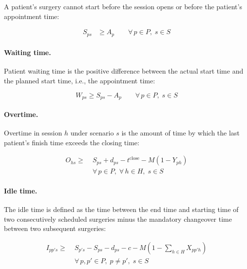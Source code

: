 A patient's surgery cannot start before the session opens or before the
patient's appointment time:

\begin{align}
  S_{ps} &\geq A_p
  \qquad \forall\, p \in P,\; s \in S
  \label{eq:lb_appt}
\end{align}

\paragraph{Waiting time.}

Patient waiting time is the positive difference between the actual start time
and the planned start time, i.e., the appointment time:

\begin{equation}
  W_{ps} \geq S_{ps} - A_p
  \qquad \forall\, p \in P,\; s \in S
  \label{eq:wait}
\end{equation}

\paragraph{Overtime.}

Overtime in session $h$ under scenario $s$ is the amount of time by which the
last patient's finish time exceeds the closing time:

\begin{align}
  O_{hs} \geq\; &
                    S_{ps} + d_{ps}
                  - t^{\text{close}}-M(1- Y_{ph}) \nonumber \\
                & \forall\, p \in P,\;\forall\, h \in H,\; s \in S
  \label{eq:overtime}
\end{align}

\paragraph{Idle time.}

The idle time is defined as the time between the end time and starting time of
two consecutively scheduled surgeries minus the mandatory changeover time
between two subsequent surgeries:

\begin{align}
  I_{pp's} \geq\; & S_{p's}-S_{ps}-d_{ps}-
                  c-M\left(1-\sum_{h \in H}X_{pp'h}\right) \nonumber \\
                &  \forall\, p,p' \in P,\; p \neq p',\; s \in S
  \label{eq:idle}
\end{align}

